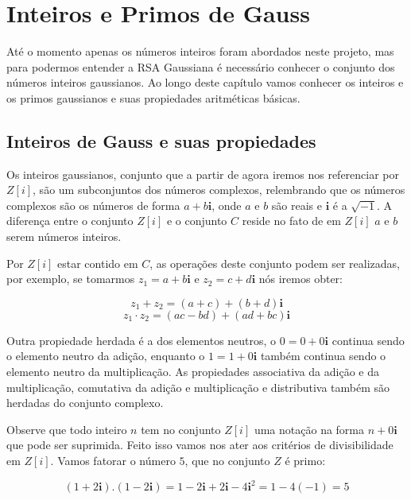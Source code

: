 \chapter {Inteiros e Primos de Gauss}
\label{IG}

\hspace{7mm}At\'e o momento apenas os n\'umeros inteiros foram abordados neste projeto, mas para podermos entender a RSA Gaussiana \'e necess\'ario conhecer o conjunto dos n\'umeros inteiros gaussianos. Ao longo deste cap\'itulo vamos conhecer os inteiros e os primos gaussianos e suas propiedades aritm\'eticas b\'asicas. 

\section{Inteiros de Gauss e suas propiedades}

\hspace{7mm}Os inteiros gaussianos, conjunto que a partir de agora iremos nos referenciar por $Z[i]$, s\~ao um subconjuntos dos n\'umeros complexos, relembrando que os n\'umeros complexos s\~ao os n\'umeros de forma $a+b\textbf{i}$, onde $a$ e $b$ s\~ao reais e $\textbf{i}$ \'e a $\sqrt{-1}$. A diferen\c{c}a entre o conjunto $Z[i]$ e o conjunto $C$ reside no fato de em $Z[i]$ $a$ e $b$ serem n\'umeros inteiros.

Por $Z[i]$ estar contido em $C$, as opera\c{c}\~oes deste conjunto podem ser realizadas, por exemplo, se tomarmos $z_1= a + b\textbf{i}$ e $z_2= c + d\textbf{i}$ n\'os iremos obter:

$$z_1   +   z_2 = (a + c) + (b + d)\textbf{i}$$
$$z_1 \cdot z_2 = (ac - bd) + (ad + bc)\textbf{i}$$

Outra propiedade herdada \'e a dos elementos neutros, o $0 = 0 + 0\textbf{i}$ continua sendo o elemento neutro da adi\c{c}\~ao, enquanto o $1 = 1 + 0\textbf{i}$ tamb\'em continua sendo o elemento neutro da multiplica\c{c}\~ao. As propiedades associativa da adi\c{c}\~ao e da multiplica\c{c}\~ao, comutativa da adi\c{c}\~ao e multiplica\c{c}\~ao e distributiva tamb\'em s\~ao herdadas do conjunto complexo.

Observe que todo inteiro $n$ tem no conjunto $Z[i]$ uma nota\c{c}\~ao na forma $n + 0 \textbf{i}$ que pode ser suprimida. Feito isso vamos nos ater aos crit\'erios de divisibilidade em $Z[i]$. Vamos fatorar o n\'umero $5$, que no conjunto $Z$ \'e primo:

$$(1 + 2\textbf{i}).(1 - 2\textbf{i}) = 1 - 2\textbf{i} + 2\textbf{i} - 4\textbf{i}^2 = 1 - 4(-1) = 5$$


